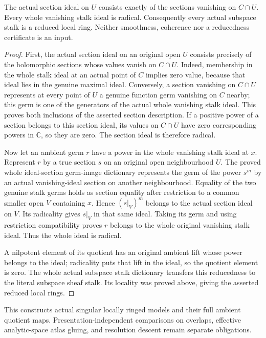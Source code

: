 \begin{theorem}
\label{hir:actual-analytic-subspace-reduced-stalks}
\leanok
The actual section ideal on $U$ consists exactly of the sections vanishing on $C\cap U$. Every whole vanishing stalk ideal is radical. Consequently every actual
subspace stalk is a reduced local ring. Neither smoothness, coherence nor
a reducedness certificate is an input.
\end{theorem}
\begin{proof}
First, the actual section ideal on an original open $U$ consists precisely
of the holomorphic sections whose values vanish on $C\cap U$.
Indeed, membership in the whole stalk ideal at an actual point of $C$
implies zero value, because that ideal lies in the genuine maximal ideal.
Conversely, a section vanishing on $C\cap U$ represents at every point of
$U$ a genuine function germ vanishing on $C$ nearby; this germ is one of
the generators of the actual whole vanishing stalk ideal. This proves
both inclusions of the asserted section description. If a positive power
of a section belongs to this section ideal, its values on $C\cap U$ have
zero corresponding powers in $\mathbb C$, so they are zero. The section
ideal is therefore radical.

Now let an ambient germ $r$ have a power in the whole vanishing stalk
ideal at $x$. Represent $r$ by a true section $s$ on an original open
neighbourhood $U$. The proved whole ideal-section germ-image dictionary
represents the germ of the power $s^m$ by an actual vanishing-ideal section
on another neighbourhood. Equality of the two genuine stalk germs holds
as section equality after restriction to a common smaller open $V$
containing $x$. Hence $(s|_V)^m$ belongs to the actual section ideal on
$V$. Its radicality gives $s|_V$ in that same ideal. Taking its germ and
using restriction compatibility proves $r$ belongs to the whole original
vanishing stalk ideal. Thus the whole ideal is radical.

A nilpotent element of its quotient has an original ambient lift whose
power belongs to the ideal; radicality puts that lift in the ideal, so
the quotient element is zero. The whole actual subspace stalk dictionary
transfers this reducedness to the literal subspace sheaf stalk. Its
locality was proved above, giving the asserted reduced local rings.
\end{proof}

This constructs actual singular locally ringed models and their full
ambient quotient maps. Presentation-independent comparisons on overlaps,
effective analytic-space atlas gluing, and resolution descent remain
separate obligations.
